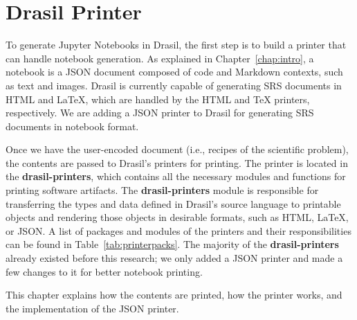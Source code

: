 \chapter{Drasil Printer} \label{chap:nbprinter}
To generate Jupyter Notebooks in Drasil, the first step is to build a printer 
that can handle notebook generation. As explained in Chapter~\ref{chap:intro}, 
a notebook is a JSON document composed of code and Markdown contexts, such as 
text and images. Drasil is currently capable of generating SRS documents in 
HTML and LaTeX, which are handled by the HTML and TeX printers, respectively. 
We are adding a JSON printer to Drasil for generating SRS documents in notebook 
format.

Once we have the user-encoded document (i.e., recipes of the scientific 
problem), the contents are passed to Drasil's printers for printing. 
The printer is located in the \textbf{drasil-printers}, which contains all the 
necessary modules and functions for printing software artifacts. The 
\textbf{drasil-printers} module is responsible for transferring the types and 
data defined in Drasil's source language to printable objects and rendering 
those objects in desirable formats, such as HTML, LaTeX, or JSON. A list of 
packages and modules of the printers and their responsibilities can be found in 
Table~\ref{tab:printerpacks}. The majority of the \textbf{drasil-printers} 
already existed before this research; we only added a JSON printer and made a 
few changes to it for better notebook printing.

This chapter explains how the contents are printed, how the printer works, and 
the implementation of the JSON printer.

